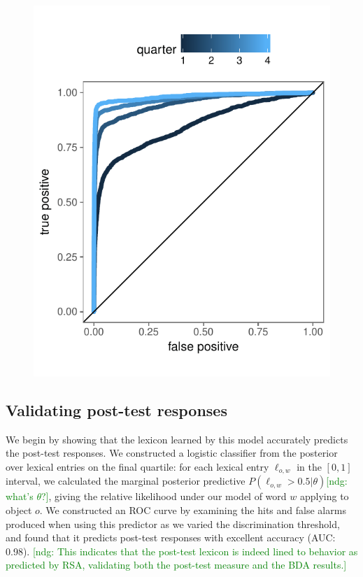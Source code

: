 \documentclass[10pt,letterpaper]{article}
\newcommand{\ndg}[1]{\textcolor{Green}{[ndg: #1]}}
\begin{document}
\begin{figure}[t]
\begin{center}
{\includegraphics[scale=0.7]{modelPerformance.pdf}}
{\caption{{\footnotesize {}  \label{fig:postTestPrediction}}}}
\end{center}
\end{figure}

\subsection{Validating post-test responses}

We begin by showing that the lexicon learned by this model accurately predicts the post-test responses. We constructed a logistic classifier from the posterior over lexical entries on the final quartile: for each lexical entry $\ell_{o,w}$ in the $[0,1]$ interval, we calculated the marginal posterior predictive $P(\ell_{o,w} > 0.5 | \theta)$\ndg{what's $\theta$?}, giving the relative likelihood under our model of word $w$ applying to object $o$. We constructed an ROC curve by examining the hits and false alarms produced when using this predictor as we varied the discrimination threshold, and found that it predicts post-test responses with excellent accuracy (AUC: 0.98). 
\ndg{This indicates that the post-test lexicon is indeed lined to behavior as predicted by RSA, validating both the post-test measure and the BDA results.}
\end{document}
